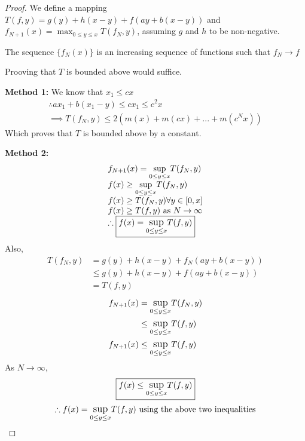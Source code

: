 \begin{proof}
    We define a mapping $T(f, y) = g(y) + h(x-y) + f(ay+b(x-y))$ and $f_{N+1}(x) = \max_{0 \le y \le x} T(f_N, y)$, assuming $g$ and $h$ to be non-negative.

    The sequence $\{f_N(x)\}$ is an increasing sequence of functions such that $f_N \rightarrow f$

    Prooving that $T$ is bounded above would suffice.

    \textbf{Method 1:} We know that $x_1 \le cx$
    $$
        \begin{array}{c}
            \therefore ax_1 + b(x_1 - y) \le cx_1 \le c^2x \\
            \implies T(f_N, y) \le 2(m(x) + m(cx) + ... + m(c^Nx))
        \end{array}
    $$
    Which proves that $T$ is bounded above by a constant. 

    \textbf{Method 2:} 
    $$
    \begin{array}{l}
        f_{N+1}(x) = \mathlarger{\sup}_{ 0 \le y \le x} T(f_N, y) \\
        f(x) \ge \mathlarger{\sup}_{ 0 \le y \le x} T(f_N, y) \\
        f(x) \ge T(f_N, y) \forall y \in [0, x] \\
        f(x) \ge T(f, y) \text{ as } N \rightarrow \infty\\
        \therefore \boxed{f(x) = \mathlarger{\sup}_{ 0 \le y \le x} T(f, y)}
    \end{array}
    $$
    Also, 
    \begin{align*}
        T(f_N, y) &= g(y) + h(x-y) + f_N(ay+b(x-y)) \\
                    &\le g(y) + h(x-y) + f(ay+b(x-y)) \\
                    &= T(f, y)
    \end{align*}
    \begin{align*}
        f_{N+1}(x) &= \mathlarger{\sup}_{ 0 \le y \le x} T(f_N, y) \\
                    &\le \mathlarger{\sup}_{ 0 \le y \le x} T(f, y) \\
        f_{N+1}(x) &\le \mathlarger{\sup}_{ 0 \le y \le x} T(f, y)
    \end{align*}
    As $N \rightarrow \infty$, 
    $$
    \boxed{f(x) \le \mathlarger{\sup}_{ 0 \le y \le x} T(f, y)}
    $$
    $$
    \therefore f(x) = \mathlarger{\sup}_{ 0 \le y \le x} T(f, y) \text{ using the above two inequalities}
    $$
\end{proof}

